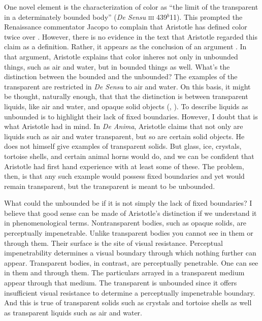 One novel element is the characterization of color as ``the limit of the transparent in a determinately bounded body'' (\emph{De Sensu} \textsc{iii} 439\( ^{b} \)11). This prompted the Renaissance commentator Jacopo \citet{Zabarella:1605kx} to complain that Aristotle has defined color twice over \citep{Broackes:1999uq}. However, there is no evidence in the text that Aristotle regarded this claim as a definition. Rather, it appears as the conclusion of an argument \citep[65]{Broackes:1999uq}. In that argument, Aristotle explains that color inheres not only in unbounded things, such as air and water, but in bounded things as well. What's the distinction between the bounded and the unbounded? The examples of the transparent are restricted in \emph{De Sensu} to air and water. On this basis, it might be thought, naturally enough, that that the distinction is between transparent liquids, like air and water, and opaque solid objects (\citealt[59]{Broackes:1999uq}, \citealt[131]{Sorabji:2004fk}). To describe liquids as unbounded is to highlight their lack of fixed boundaries. However, I doubt that is what Aristotle had in mind. In \emph{De Anima}, Aristotle claims that not only are liquids such as air and water transparent, but so are certain solid objects. He does not himself give examples of transparent solids. But glass, ice, crystals, tortoise shells, and certain animal horns would do, and we can be confident that Aristotle had first hand experience with at least some of these. The problem, then, is that any such example would possess fixed boundaries and yet would remain transparent, but the transparent is meant to be unbounded. 

What could the unbounded be if it is not simply the lack of fixed boundaries? I believe that good sense can be made of Aristotle's distinction if we understand it in phenomenological terms. Nontransparent bodies, such as opaque solids, are perceptually impenetrable. Unlike transparent bodies you cannot see in them or through them. Their surface is the site of visual resistance. Perceptual impenetrability determines a visual boundary through which nothing further can appear. Transparent bodies, in contrast, are perceptually penetrable. One can see in them and through them. The particulars arrayed in a transparent medium appear through that medium. The transparent is unbounded since it offers insufficient visual resistance to determine a perceptually impenetrable boundary. And this is true of transparent solids such as crystals and tortoise shells as well as transparent liquids such as air and water.

